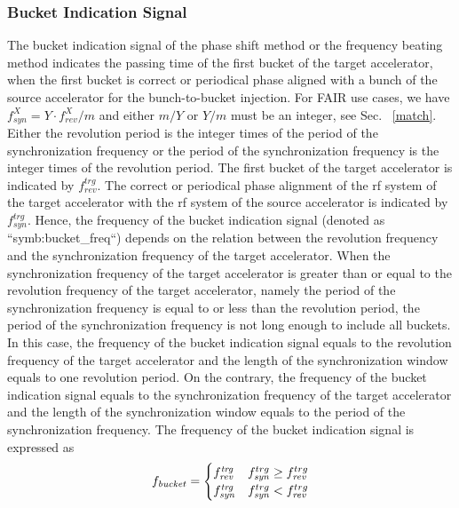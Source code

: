 \subsubsection{Bucket Indication Signal}
The bucket indication signal of the phase shift method or the frequency beating method indicates the passing time of the first bucket of the target accelerator, when the first bucket is correct or periodical phase aligned with a bunch of the source accelerator for the bunch-to-bucket injection. For FAIR use cases, we have $f_\mathit{syn}^{X}=Y\cdot f_\mathit{rev}^{X}/m$ and either $m/Y$ or $Y/m$ must be an integer, see Sec. ~\ref{match}. Either the revolution period is the integer times of the period of the synchronization frequency or the period of the synchronization frequency is the integer times of the revolution period. The first bucket of the target accelerator is indicated by $f_{\mathit{rev}}^{trg}$. The correct or periodical phase alignment of the rf system of the target accelerator with the rf system of the source accelerator is indicated by $f_{\mathit{syn}}^{trg}$. Hence, the frequency of the bucket indication signal (denoted as ``\gls{symb:bucket_freq}``) depends on the relation between the revolution frequency and the synchronization frequency of the target accelerator. When the synchronization frequency of the target accelerator is greater than or equal to the revolution frequency of the target accelerator, namely the period of the synchronization frequency is equal to or less than the revolution period, the period of the synchronization frequency is not long enough to include all buckets. In this case, the frequency of the bucket indication signal equals to the revolution frequency of the target accelerator and the length of the synchronization window equals to one revolution period. On the contrary, the frequency of the bucket indication signal equals to the synchronization frequency of the target accelerator and the length of the synchronization window equals to the period of the synchronization frequency. The frequency of the bucket indication signal is expressed as
\begin{eqnarray}
\label{bucket_ind}
f_\mathit{bucket}=
\begin{cases}
f_\mathit{rev}^\mathit{trg} &f_{\mathit{syn}}^{trg}\ge f_{\mathit{rev}}^{trg}\cr

f_\mathit{syn}^\mathit{trg}
&f_{\mathit{syn}}^{trg}<f_{\mathit{rev}}^{trg}
\end{cases}
\end{eqnarray}

